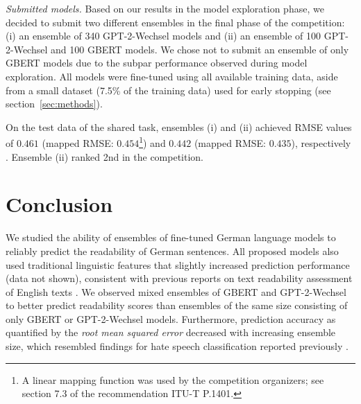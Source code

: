 \documentclass[11pt,a4paper]{article}
\begin{document}
\emph{Submitted models.}
Based on our results in the model exploration phase, we decided to submit two different ensembles in the final phase of the competition: (i) an ensemble of 340 GPT-2-Wechsel models and (ii) an ensemble of 100 GPT-2-Wechsel and 100 GBERT models.
We chose not to submit an ensemble of only GBERT models due to the subpar performance observed during model exploration.
All models were fine-tuned using all available training data, aside from a small dataset (7.5\% of the training data) used for early stopping (see section~\ref{sec:methods}).

On the test data of the shared task, ensembles (i) and (ii) achieved RMSE values of $0.461$ (mapped RMSE: $0.454$\footnote{A linear mapping function was used by the competition organizers; see section 7.3 of the recommendation ITU-T P.1401.}) and $0.442$ (mapped RMSE: $0.435$\footnotemark[5]), respectively \cite{Mohtaj2022}.
Ensemble (ii) ranked 2nd in the competition.
 
\section{Conclusion}

We studied the ability of ensembles of fine-tuned German language models to reliably predict the readability of German sentences. 
All proposed models also used traditional linguistic features that slightly increased prediction performance (data not shown), consistent with previous reports on text readability assessment of English texts \cite{Imperial2021,Lee2021}. 
We observed mixed ensembles of GBERT and GPT-2-Wechsel to better predict readability scores than ensembles of the same size consisting of only GBERT or GPT-2-Wechsel models. 
Furthermore, prediction accuracy as quantified by the \emph{root mean squared error} decreased with increasing ensemble size, which resembled findings for hate speech classification reported previously \cite{Risch2020,Bornheim2021}.
 
\end{document}
